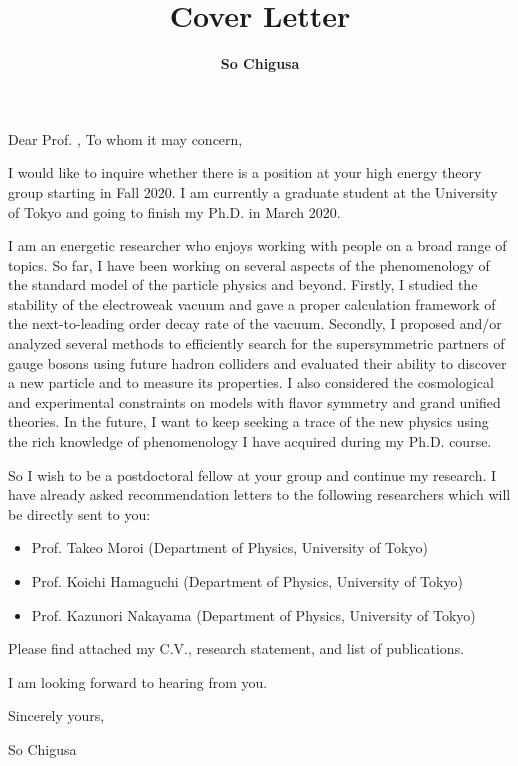 \documentclass[12pt,notitlepage]{article}
\title{\vspace*{-3cm}Cover Letter}
\author{\textbf{So Chigusa}}
\date{}
\def\noprofessorname{} %
\begin{document}
\maketitle
\thispagestyle{empty}

\ifthenelse{\isundefined{\noprofessorname}}
{Dear Prof. \professorname,}
{To whom it may concern,}

\vspace{5mm}
I would like to inquire whether there is a  position at your high energy theory group starting in Fall 2020.
I am currently a graduate student at the University of Tokyo and going to finish my Ph.D. in March 2020.

I am an energetic researcher who enjoys working with people on a broad range of topics.
So far, I have been working on several aspects of the phenomenology of the standard model of the particle physics and beyond.
Firstly, I studied the stability of the electroweak vacuum and gave a proper calculation framework of the next-to-leading order decay rate of the vacuum.
Secondly, I proposed and/or analyzed several methods to efficiently search for the supersymmetric partners of gauge bosons using future hadron colliders and evaluated their ability to discover a new particle and to measure its properties.
I also considered the cosmological and experimental constraints on models with flavor symmetry and grand unified theories.
In the future, I want to keep seeking a trace of the new physics using the rich knowledge of phenomenology I have acquired during my Ph.D. course.

So I wish to be a postdoctoral fellow at your group and continue my research.
I have already asked recommendation letters to the following researchers which will be directly sent to you:
\vspace{-2mm}
\begin{itemize}
  \setlength{\parskip}{1mm}
  \setlength{\itemsep}{0cm}
  \item Prof. Takeo Moroi (Department of Physics, University of Tokyo)
  \item Prof. Koichi Hamaguchi (Department of Physics, University of Tokyo)
  \item Prof. Kazunori Nakayama (Department of Physics, University of Tokyo)
\end{itemize}
\vspace{-2mm}
Please find attached my C.V., research statement, and list of publications.

I am looking forward to hearing from you.

\vspace{5mm}
Sincerely yours,

\vspace{5mm}
So Chigusa
\end{document}
